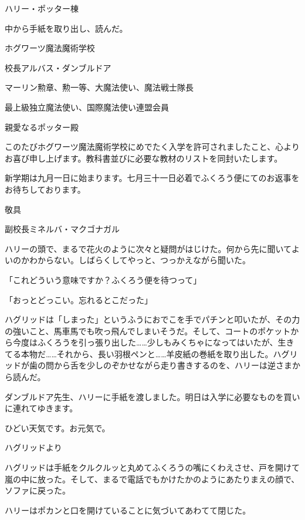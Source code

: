 \documentclass[10pt,a4paper]{article}
\begin{document}
\begin{CJK}{UTF8}{min}
ハリー・ポッター棟



中から手紙を取り出し、読んだ。



ホグワーツ魔法魔術学校

校長アルバス・ダンブルドア

マーリン勲章、勲一等、大魔法使い、魔法戦士隊長

最上級独立魔法使い、国際魔法使い連盟会員



親愛なるポッター殿

このたびホグワーツ魔法魔術学校にめでたく入学を許可されましたこと、心よりお喜び申し上げます。教科書並びに必要な教材のリストを同封いたします。

新学期は九月一日に始まります。七月三十一日必着でふくろう便にてのお返事をお待ちしております。



敬具



副校長ミネルバ・マクゴナガル





ハリーの頭で、まるで花火のように次々と疑問がはじけた。何から先に聞いてよいのかわからない。しばらくしてやっと、つっかえながら聞いた。

「これどういう意味ですか？ふくろう便を待つって」

「おっとどっこい。忘れるとこだった」

ハグリッドは「しまった」というふうにおでこを手でパチンと叩いたが、その力の強いこと、馬車馬でも吹っ飛んでしまいそうだ。そして、コートのポケットから今度はふくろうを引っ張り出した……少しもみくちゃになってはいたが、生きてる本物だ……それから、長い羽根ペンと……羊皮紙の巻紙を取り出した。ハグリッドが歯の問から舌を少しのぞかせながら走り書きするのを、ハリーは逆さまから読んだ。



ダンブルドア先生、ハリーに手紙を渡しました。明日は入学に必要なものを買いに連れてゆきます。

ひどい天気です。お元気で。

ハグリッドより





ハグリッドは手紙をクルクルッと丸めてふくろうの嘴にくわえさせ、戸を開けて嵐の中に放った。そして、まるで電話でもかけたかのようにあたりまえの顔で、ソファに戻った。

ハリーはポカンと口を開けていることに気づいてあわてて閉じた。


\end{CJK}
\end{document}
